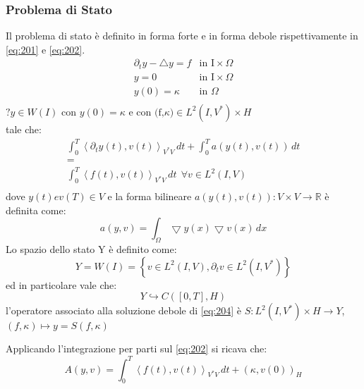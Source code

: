 \subsubsection{Problema di Stato}
Il problema di stato è definito in forma forte e in forma debole rispettivamente in \ref{eq:201} e \ref{eq:202}.
\begin{equation}
\begin{array}{cc}
 	{\partial_{t}}y - {\bigtriangleup}y = f & \text{in I}\times\Omega \\
	y=0 & \text{in I}\times\Omega \\
	y(0) = \kappa & \text{in }\Omega \\
\end{array}
\label{eq:201}
\end{equation}
$\text{?} y \in W(I) \text{ con } y(0)=\kappa \text{ e } \text{con (f,}\kappa) \in L^2(I,V^*)\times H$ \\
tale che:
\begin{equation}
\begin{array}{c}
	\int_{0}^{T} \left \langle {\partial_{t}}y(t),v(t) \right \rangle_{V^*V} \, dt +  	\int_{0}^{T} a(y(t),v(t)) \, dt  \\
	 = \\
	\int_{0}^{T} \left \langle f(t),v(t) \right \rangle_{V^*V} \, dt \ \ \forall v \in L^2(I,V) \\
\end{array}
\label{eq:202}
\end{equation}
dove $y(t) e v(T) \in V$ e la forma bilineare $a(y(t),v(t)): V{\times}V\rightarrow\mathbb{R}$ è definita come:
\begin{equation}
 a(y,v) = \int_{\Omega} {\bigtriangledown}y(x){\bigtriangledown}v(x) \, dx
\label{eq:203}
\end{equation}
Lo spazio dello stato Y è definito come:
\begin{equation}
Y = W(I) =  \left\{ v \in L^2(I, V), {{\partial}_{t}}v \in L^2(I, V^*) \right\}
\label{eq:204}
\end{equation}
ed in particolare vale che:
\begin{equation}
Y \hookrightarrow C(\left[0,T\right], H)
\label{eq:205}
\end{equation}
l'operatore associato alla soluzione debole di \ref{eq:204} è $S : L^2(I,V^*) \times H \rightarrow Y$, $(f,\kappa) \longmapsto y = S(f,\kappa)$ 
\par
Applicando l'integrazione per parti sul \ref{eq:202} si ricava che:
\begin{equation}
A(y,v) = \int_{0}^{T} \left \langle f(t),v(t) \right \rangle_{V^*V} \, dt + ({\kappa},v(0))_H
\label{eq:206}
\end{equation}
